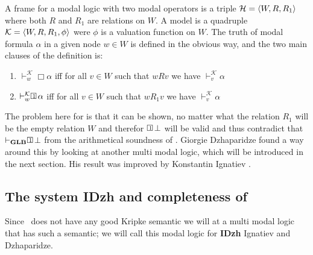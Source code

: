 \documentclass[../main.tex]{subfiles}
\begin{document}
\begin{defi}
	A  frame for a modal logic with two modal operators is a triple
	$\mathcal{H}=\langle W,R,R_1\rangle$ where both $R$ and $R_1$ are relations on
	$W$. A model is a quadruple $\mathcal{K}=\langle W, R,R_1,\phi\rangle$ were
	$\phi$ is a valuation function on $W$. The truth of modal formula
	$\alpha$ in a given node $w\in W$ is defined in the obvious way, and
	the two main clauses of the definition is:
	\begin{enumerate}
		\item $\vdash_w^\mathcal{K}\Box\alpha$ iff for all $v\in W$ such
			that $wRv$ we have $\vdash_v^\mathcal{K}\alpha$
		\item $\vdash_w^\mathcal{K}\OneBox\alpha$ iff for all $v\in W$ such
			that $wR_1v$ we have $\vdash_v^\mathcal{K}\alpha$
	\end{enumerate}
\end{defi}
The problem here for is that it can be shown, no matter what the relation $R_1$ will be the
empty relation $W$ and therefor $\OneBox\bot$ will be valid and thus contradict
that $\vdash_\GLB\OneBox\bot$ from the arithmetical  soundness of \GLB. Giorgie
Dzhaparidze found a way around this by looking at another multi modal logic,
which will be introduced in the next section. His result was improved  by
Konstantin Ignatiev .

\subsection{The system \textbf{IDzh} and completeness of \GLB}

Since \GLB\ does not have any good Kripke semantic we will at a multi modal logic that
has such a semantic; we will call this modal logic for \textbf{IDzh} Ignatiev
and Dzhaparidze.
\end{document}
